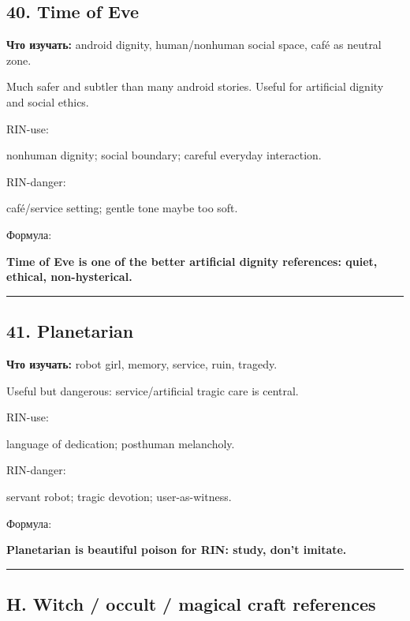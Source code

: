 \subsection*{40. Time of Eve}

\textbf{Что изучать:} android dignity, human/\hspace{0pt}nonhuman social space, café
as neutral zone.

Much safer and subtler than many android stories. Useful for artificial
dignity and social ethics.

RIN-use:

nonhuman dignity; social boundary; careful everyday interaction.

RIN-danger:

café/\hspace{0pt}service setting; gentle tone maybe too soft.

Формула:

\textbf{Time of Eve is one of the better artificial dignity references:
quiet, ethical, non-hysterical.}

\begin{center}\rule{0.5\linewidth}{0.5pt}\end{center}

\subsection*{41. Planetarian}

\textbf{Что изучать:} robot girl, memory, service, ruin, tragedy.

Useful but dangerous: service/\hspace{0pt}artificial tragic care is central.

RIN-use:

language of dedication; posthuman melancholy.

RIN-danger:

servant robot; tragic devotion; user-as-witness.

Формула:

\textbf{Planetarian is beautiful poison for RIN: study, don't imitate.}

\begin{center}\rule{0.5\linewidth}{0.5pt}\end{center}

\subsection*{H. Witch /\hspace{0pt} occult /\hspace{0pt} magical craft references}

